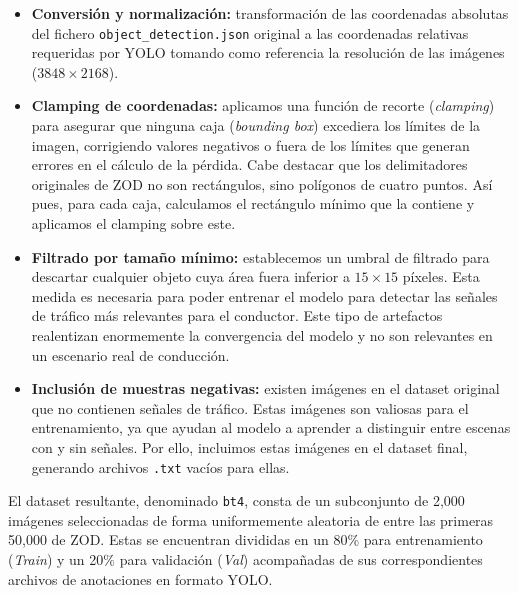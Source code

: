 \documentclass[11pt,a4paper]{article}
\begin{document}
\begin{itemize}
    \item \textbf{Conversión y normalización:} transformación de las coordenadas absolutas del 
            fichero \texttt{object\_detection.json} original a las coordenadas relativas requeridas por YOLO 
            tomando como referencia la resolución de las imágenes ($3848 \times 2168$).
    
    \item \textbf{Clamping de coordenadas:} aplicamos una función de recorte (\textit{clamping}) 
            para asegurar que ninguna caja (\textit{bounding box}) excediera los límites de la imagen, 
            corrigiendo valores negativos o fuera de los límites que generan errores en el cálculo de la pérdida.
            Cabe destacar que los delimitadores originales de ZOD no son rectángulos, sino polígonos de cuatro puntos.
            Así pues, para cada caja, calculamos el rectángulo mínimo que la contiene y aplicamos el clamping sobre este.
    
    \item \textbf{Filtrado por tamaño mínimo:} establecemos un umbral de filtrado para descartar cualquier 
            objeto cuya área fuera inferior a $15 \times 15$ píxeles. Esta medida es necesaria
            para poder entrenar el modelo para detectar las señales de tráfico más relevantes
            para el conductor. Este tipo de artefactos realentizan enormemente la convergencia del modelo
            y no son relevantes en un escenario real de conducción.

    \item \textbf{Inclusión de muestras negativas:} existen imágenes en el dataset original que no contienen señales de tráfico. 
            Estas imágenes son valiosas para el entrenamiento, ya que ayudan al modelo a aprender a distinguir entre 
            escenas con y sin señales. Por ello, incluimos estas imágenes en el dataset final, 
            generando archivos \texttt{.txt} vacíos para ellas.
\end{itemize}

El dataset resultante, denominado \texttt{bt4}, consta de un subconjunto de 2,000 imágenes 
seleccionadas de forma uniformemente aleatoria de entre las primeras 50,000 de ZOD. 
Estas se encuentran divididas en un 80\% para entrenamiento (\textit{Train}) y un 20\% 
para validación (\textit{Val}) acompañadas de sus correspondientes archivos de anotaciones en formato YOLO.
\end{document}
